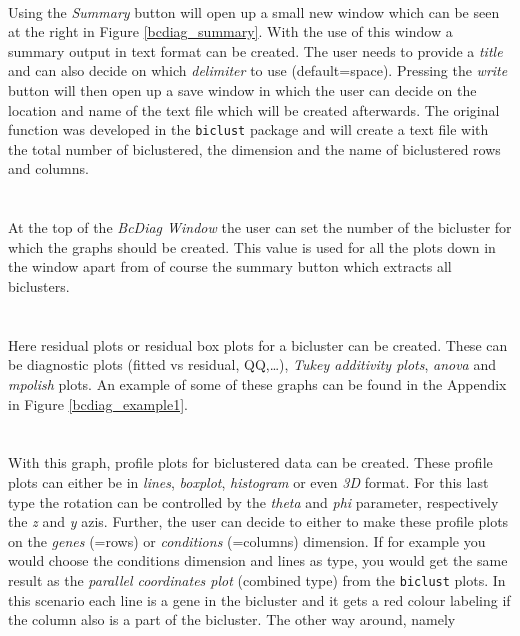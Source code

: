 \documentclass[a4paper]{article}\usepackage[]{graphicx}\usepackage[]{color}
\begin{document}
\\
Using the {\it Summary} button will open up a small new window which can be seen
at the right in Figure \ref{bcdiag_summary}. With the use of this window a
summary output in text format can be created. The user needs to provide a {\it
title} and can also decide on which {\it delimiter} to use (default=space). 
Pressing the {\it write} button will then open up a save window in which the
user can decide on the location and name of the text file which will be created
afterwards.
The original function was developed in the \verb|biclust| package and will
create a text file with the total number of biclustered, the dimension and the name of
biclustered rows and columns.
\\ \\
\\
At the top of the {\it BcDiag Window} the user can set the number of the
bicluster for which the graphs should be created. This value is used for all the
plots down in the window apart from of course the summary button which extracts
all biclusters.
\\ \\
\\
Here residual plots or residual box plots for a bicluster can be created. These
can be diagnostic plots (fitted vs residual, QQ,\dots), {\it Tukey additivity
plots}, {\it anova} and {\it mpolish} plots. An example of some of these graphs
can be found in the Appendix in Figure \ref{bcdiag_example1}.
\\ \\
\\
With this graph, profile plots for biclustered data can be created. These
profile plots can either be in {\it lines}, {\it boxplot}, {\it histogram} or
even {\it 3D} format.
For this last type the rotation can be controlled by the {\it theta} and {\it
phi} parameter, respectively the {\it z} and {\it y} azis. Further, the user can
decide to either to make these profile plots on the {\it genes} (=rows) or {\it
conditions} (=columns) dimension. If for example you would choose the conditions
dimension and lines as type, you would get the same result as the {\it parallel
coordinates plot} (combined type) from the \verb|biclust| plots. In this
scenario each line is a gene in the bicluster and it gets a red colour labeling
if the column also is a part of the bicluster. The other way around, namely
\end{document}
